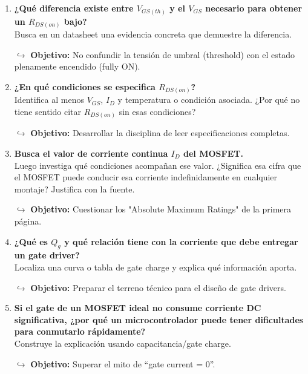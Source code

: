 \documentclass[11pt, a4paper]{article}
\begin{document}
\begin{enumerate}[label=\textbf{\arabic*.}, leftmargin=*, itemsep=12pt]

    \item \textbf{¿Qué diferencia existe entre $V_{GS(th)}$ y el $V_{GS}$ necesario para obtener un $R_{DS(on)}$ bajo?}\\
    Busca en un datasheet una evidencia concreta que demuestre la diferencia.
    \par\vspace{2pt}\textcolor{objgray}{\small $\hookrightarrow$ \textbf{Objetivo:} No confundir la tensión de umbral (threshold) con el estado plenamente encendido (fully ON).}

    \item \textbf{¿En qué condiciones se especifica $R_{DS(on)}$?}\\
    Identifica al menos $V_{GS}$, $I_D$ y temperatura o condición asociada. ¿Por qué no tiene sentido citar $R_{DS(on)}$ sin esas condiciones?
    \par\vspace{2pt}\textcolor{objgray}{\small $\hookrightarrow$ \textbf{Objetivo:} Desarrollar la disciplina de leer especificaciones completas.}

    \item \textbf{Busca el valor de corriente continua $I_D$ del MOSFET.}\\
    Luego investiga qué condiciones acompañan ese valor. ¿Significa esa cifra que el MOSFET puede conducir esa corriente indefinidamente en cualquier montaje? Justifica con la fuente.
    \par\vspace{2pt}\textcolor{objgray}{\small $\hookrightarrow$ \textbf{Objetivo:} Cuestionar los "Absolute Maximum Ratings" de la primera página.}

    \item \textbf{¿Qué es $Q_g$ y qué relación tiene con la corriente que debe entregar un gate driver?}\\
    Localiza una curva o tabla de gate charge y explica qué información aporta.
    \par\vspace{2pt}\textcolor{objgray}{\small $\hookrightarrow$ \textbf{Objetivo:} Preparar el terreno técnico para el diseño de gate drivers.}

    \item \textbf{Si el gate de un MOSFET ideal no consume corriente DC significativa, ¿por qué un microcontrolador puede tener dificultades para conmutarlo rápidamente?}\\
    Construye la explicación usando capacitancia/gate charge.
    \par\vspace{2pt}\textcolor{objgray}{\small $\hookrightarrow$ \textbf{Objetivo:} Superar el mito de ``gate current = 0''.}


\end{enumerate}
\end{document}
